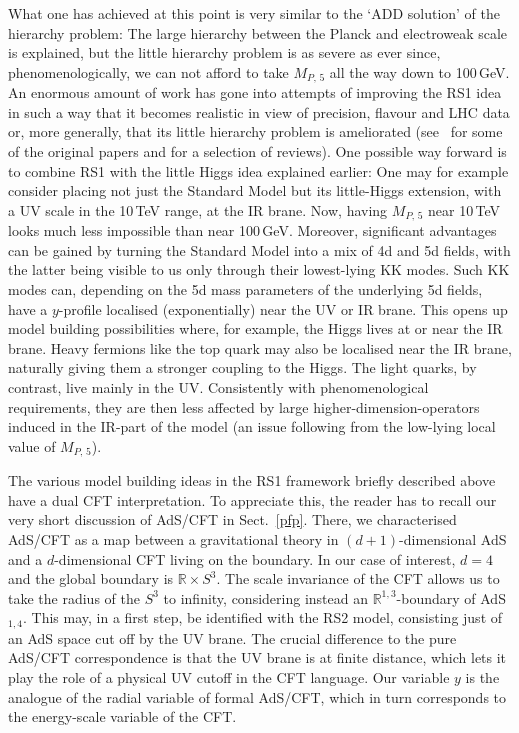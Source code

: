 \documentclass[12pt]{article}
\numberwithin{equation}{section}
\begin{document}
What one has achieved at this point is very similar to the `ADD solution' of the hierarchy problem: The large hierarchy between the Planck and electroweak scale is explained, but the little hierarchy problem is as severe as ever since, phenomenologically, we can not afford to take $M_{P,\,5}$ all the way down to 100$\,$GeV. An enormous amount of work has gone into attempts of improving the RS1 idea in such a way that it becomes realistic in view of precision, flavour and LHC data or, more generally, that its little hierarchy problem is ameliorated (see~\cite{Gherghetta:2000qt, Contino:2003ve, Agashe:2003zs, Agashe:2004rs} for some of the original papers and \cite{Csaki:2005vy, Gherghetta:2006ha, Kribs:2006mq, Rattazzi:2003ea, Contino:2010rs, Gherghetta:2010cj, vonGersdorff:2011rz} for a selection of reviews). One possible way forward is to combine RS1 with the little Higgs idea explained earlier: One may for example consider placing not just the Standard Model but its little-Higgs extension, with a UV scale in the 10$\,$TeV range, at the IR brane. Now, having $M_{P,\,5}$ near 10$\,$TeV looks much less impossible than near 100$\,$GeV. Moreover, significant advantages can be gained by turning the Standard Model into a mix of 4d and 5d fields, with the latter being visible to us only through their lowest-lying KK modes. Such KK modes can, depending on the 5d mass parameters of the underlying 5d fields, have a $y$-profile localised (exponentially) near the UV or IR brane. This opens up model building possibilities where, for example, the Higgs lives at or near the IR brane. Heavy fermions like the top quark may also be localised near the IR brane, naturally giving them a stronger coupling to the Higgs. The light quarks, by contrast, live mainly in the UV.  Consistently with phenomenological requirements, they are then less affected by large higher-dimension-operators induced in the IR-part of the model (an issue following from the low-lying local value of $M_{P,\,5}$).

The various model building ideas in the RS1 framework briefly described above have a dual CFT interpretation. To appreciate this, the reader has to recall our very short discussion of AdS/CFT in Sect.~\ref{pfp}. There, we characterised AdS/CFT as a map between a gravitational theory in $(d\!+\!1)$-dimensional AdS and a $d$-dimensional CFT living on the boundary. In our case of interest, $d=4$ and the global boundary is $\mathbb{R}\times S^3$. The scale invariance of the CFT allows us to take the radius of the $S^3$ to infinity, considering instead an $\mathbb{R}^{1,3}$-boundary of AdS$_{1,4}$. This may, in a first step, be identified with the RS2 model, consisting just of an AdS space cut off by the UV brane. The crucial difference to the pure AdS/CFT correspondence is that the UV brane is at finite distance, which lets it play the role of a physical UV cutoff in the CFT language. Our variable $y$ is the analogue of the radial variable of formal AdS/CFT, which in turn corresponds to the energy-scale variable of the CFT.
\end{document}
